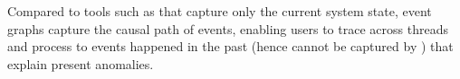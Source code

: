 Compared to tools such as \spindump that capture only the current
system state, event graphs capture the causal path of events, enabling
users to trace across threads and process to events happened in the past
(hence cannot be captured by \spindump) that explain present
anomalies.


